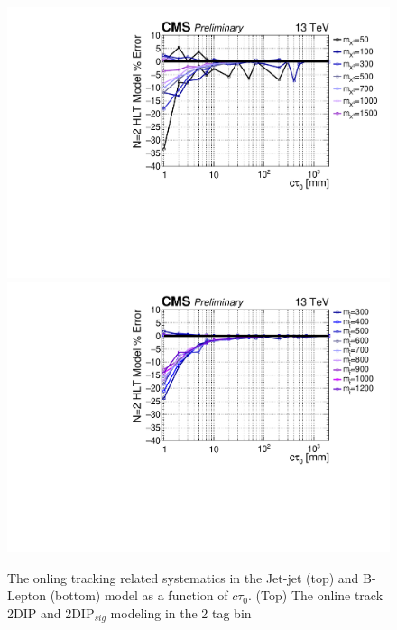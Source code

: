 \begin{figure}
\begin{center}
\includegraphics[width=.70\textwidth]{figures/an/SYSTEMATICS/76x_pu/sys_2tag_hlt.pdf}
\includegraphics[width=.70\textwidth]{figures/an/SYSTEMATICS/76x_pu/sys_2tag_hlt_dsusy.pdf}
\caption{The onling tracking related systematics in the Jet-jet (top) and B-Lepton
 (bottom)  model as a function of $c\tau_0$. (Top) The online track 2DIP and
 2DIP$_{sig}$ modeling in the 2 tag bin   \label{fig:online_tracking_sys}}
\end{center}
\end{figure}


